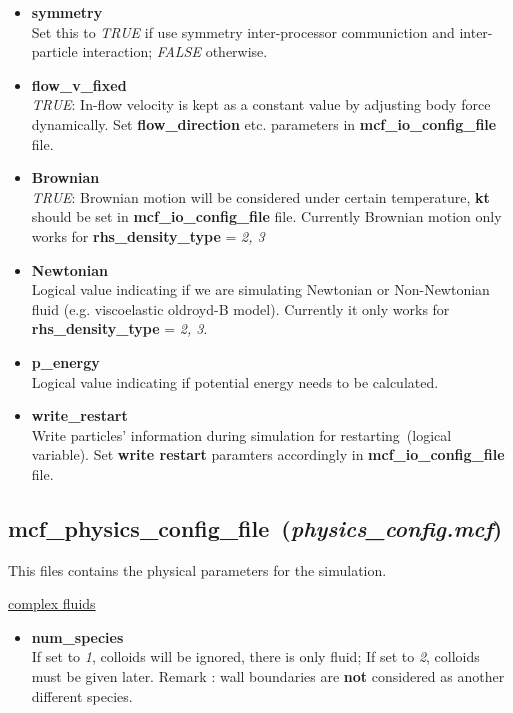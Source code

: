 \documentclass[a4paper,10pt]{article}
\begin{document}
\begin{itemize}
\item
\textbf{symmetry}\\
Set this to \textit{TRUE} if use symmetry 
inter-processor communiction and
inter-particle interaction;
\textit{FALSE} otherwise.

\item
\textbf{flow\_v\_fixed}\\
\textit{TRUE}: 
In-flow velocity is kept as a constant value
by adjusting body force dynamically.
Set \textbf{flow\_direction} etc. parameters in
\textbf{mcf\_io\_config\_file} file.


\item
\textbf{Brownian}\\
\textit{TRUE}: Brownian motion will be considered
under certain temperature, 
\textbf{kt} should be set in
\textbf{mcf\_io\_config\_file} file.
Currently Brownian motion only works for 
\textbf{rhs\_density\_type} = 
\textit{2, 3}

\item
\textbf{Newtonian}\\
Logical value indicating if we are
simulating Newtonian or Non-Newtonian 
fluid (e.g. viscoelastic oldroyd-B model).
Currently it only works for 
\textbf{rhs\_density\_type} = 
\textit{2, 3}.

\item
\textbf{p\_energy}\\
Logical value indicating if potential
energy needs to be calculated.

\item
\textbf{write\_restart} \\
Write particles' information during simulation
for restarting~(logical variable).
Set \textbf{write restart }paramters accordingly in
\textbf{mcf\_io\_config\_file} file.

\end{itemize}

\subsection{\textbf{mcf\_physics\_config\_file}~(\textit{physics\_config.mcf})}
This files contains the physical parameters
for the simulation.


\begin{center}
\underline{\textlangle complex fluids \textrangle}
\end{center}

\begin{itemize}

\item\textbf{ num\_species}\\
If set to \textit{1}, colloids will be ignored,
there is only fluid;
If set to \textit{2}, colloids must be given later. 
Remark :
wall boundaries are \textbf{not} considered 
as another different species.

\end{itemize}
\end{document}
